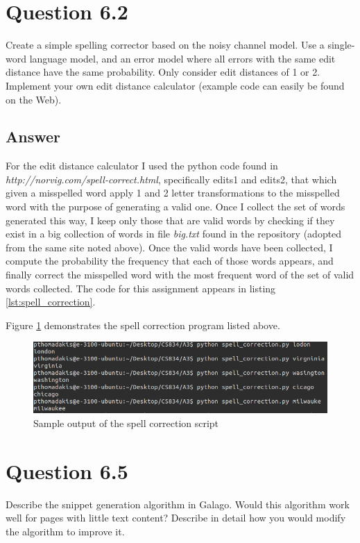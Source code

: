 \documentclass{article}
\begin{document}
	\section*{Question 6.2}
	Create a simple spelling corrector based on the noisy channel model. Use a
	single-word language model, and an error model where all errors with the same
	edit distance have the same probability. Only consider edit distances of 1 or 2.
	Implement your own edit distance calculator (example code can easily be found
	on the Web).
	\subsection*{Answer}
	For the edit distance calculator I used the python code found in \textit{http://norvig.com/spell-correct.html}, specifically edits1 and edits2, that which given a misspelled word apply 1 and 2 letter transformations to the misspelled word with the purpose of generating a valid one. Once I collect the set of words generated this way, I keep only those that are valid words by checking if they exist in a big collection of words in file \textit{big.txt} found in the repository (adopted from the same site noted above). Once the valid words have been collected, I compute the probability the frequency that each of those words appears, and finally correct the misspelled word with the most frequent word of the set of valid words collected. The code for this assignment appears in listing \ref{lst:spell_correction}.
	
	Figure \ref{fig:spell_correction} demonstrates the spell correction program listed above.
	\begin{figure}[h]
		\includegraphics[width=\linewidth]{spell_correction.png}
		\caption{Sample output of the spell correction script}
		\label{fig:spell_correction}
	\end{figure}
	\section*{Question 6.5}
	Describe the snippet generation algorithm in Galago. Would this algorithm
	work well for pages with little text content? Describe in detail how you would
	modify the algorithm to improve it.
\end{document}
